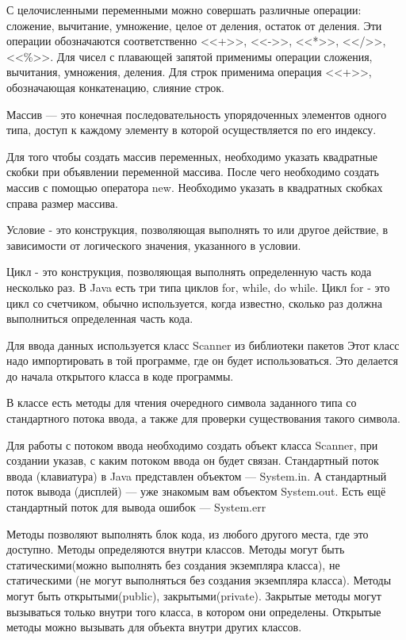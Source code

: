 \documentclass[14pt, a4paper]{extarticle}
\begin{document}
С целочисленными переменными можно совершать различные
операции: сложение, вычитание, умножение, целое от деления, остаток
от деления. Эти операции обозначаются соответственно <<+>>, <<->>, <<*>>, <</>>,
<<\%>>. Для чисел с плавающей запятой применимы операции сложения,
вычитания, умножения, деления. Для строк применима операция <<+>>,
обозначающая конкатенацию, слияние строк.

Массив — это конечная последовательность упорядоченных
элементов одного типа, доступ к каждому элементу в которой
осуществляется по его индексу.

Для того чтобы создать массив переменных, необходимо указать
квадратные скобки при объявлении переменной массива. После чего
необходимо создать массив с помощью оператора new. Необходимо
указать в квадратных скобках справа размер массива.

Условие - это конструкция, позволяющая выполнять то или другое
действие, в зависимости от логического значения, указанного в условии. 

Цикл - это конструкция, позволяющая выполнять определенную
часть кода несколько раз. В Java есть три типа циклов for, while, do while.
Цикл for - это цикл со счетчиком, обычно используется, когда
известно, сколько раз должна выполниться определенная часть кода. 

Для ввода данных используется класс Scanner из библиотеки пакетов
Этот класс надо импортировать в той программе, где он будет
использоваться. Это делается до начала открытого класса в
коде программы.

В классе есть методы для чтения очередного символа заданного
типа со стандартного потока ввода, а также для проверки
существования такого символа.

Для работы с потоком ввода необходимо создать объект
класса Scanner, при создании указав, с каким потоком ввода он
будет связан. Стандартный поток ввода (клавиатура) в Java
представлен объектом — System.in. А стандартный поток вывода
(дисплей) — уже знакомым вам объектом System.out. Есть ещё
стандартный поток для вывода ошибок — System.err

Методы позволяют выполнять блок кода, из любого другого места,
где это доступно. Методы определяются внутри классов. Методы могут 
быть статическими(можно выполнять без создания экземпляра класса),
не статическими (не могут выполняться без создания экземпляра
класса). Методы могут быть открытыми(public), закрытыми(private).
Закрытые методы могут вызываться только внутри того класса, в
котором они определены. Открытые методы можно вызывать для
объекта внутри других классов.
\end{document}
